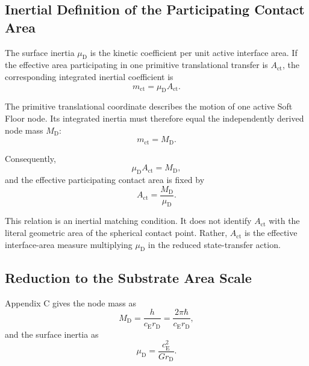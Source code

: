 \subsection{Inertial Definition of the Participating Contact Area}

The surface inertia $\mu_{\mathrm{D}}$ is the kinetic coefficient per unit active interface area. If the effective area participating in one primitive translational transfer is $A_{\mathrm{ct}}$, the corresponding integrated inertial coefficient is
\begin{equation}
    m_{\mathrm{ct}} = \mu_{\mathrm{D}}A_{\mathrm{ct}}.
\end{equation}

The primitive translational coordinate describes the motion of one active Soft Floor node. Its integrated inertia must therefore equal the independently derived node mass $M_{\mathrm{D}}$:
\begin{equation}
    \boxed{ m_{\mathrm{ct}} = M_{\mathrm{D}} }.
\end{equation}

Consequently,
\begin{equation}
    \mu_{\mathrm{D}}A_{\mathrm{ct}} = M_{\mathrm{D}},
\end{equation}
and the effective participating contact area is fixed by
\begin{equation}
    \boxed{ A_{\mathrm{ct}} = \frac{M_{\mathrm{D}}}{\mu_{\mathrm{D}}} }.
\end{equation}

This relation is an inertial matching condition. It does not identify $A_{\mathrm{ct}}$ with the literal geometric area of the spherical contact point. Rather, $A_{\mathrm{ct}}$ is the effective interface-area measure multiplying $\mu_{\mathrm{D}}$ in the reduced state-transfer action.

\subsection{Reduction to the Substrate Area Scale}

Appendix C gives the node mass as
\begin{equation}
    M_{\mathrm{D}} = \frac{h}{c_{\mathrm{E}}r_{\mathrm{D}}} = \frac{2\pi\hbar}{c_{\mathrm{E}}r_{\mathrm{D}}},
\end{equation}
and the surface inertia as
\begin{equation}
    \mu_{\mathrm{D}} = \frac{c_{\mathrm{E}}^2}{Gr_{\mathrm{D}}}.
\end{equation}

